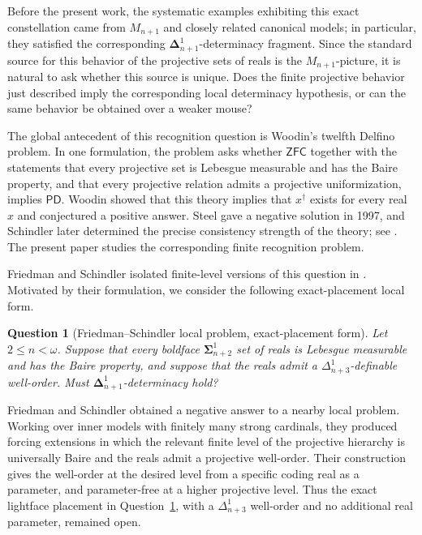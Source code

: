 \documentclass[a4paper,11pt]{article}
\newtheorem{question}{Question}
\newcommand{\PD}{\mathsf{PD}}
\begin{document}
Before the present work, the systematic examples exhibiting this exact
constellation came from \(M_{n+1}\) and closely related canonical models;
in particular, they satisfied the corresponding
\(\boldsymbol\Delta^1_{n+1}\)-determinacy fragment.  Since the standard
source for this behavior of the projective sets of reals is the
\(M_{n+1}\)-picture, it is natural to ask whether this source is unique.
Does the finite projective behavior just described imply the corresponding
local determinacy hypothesis, or can the same behavior be obtained over a
weaker mouse?



The global antecedent of this recognition question is Woodin's twelfth
Delfino problem.  In one formulation, the problem asks whether $\mathsf{ZFC}$
together with the statements that every projective set is Lebesgue measurable
and has the Baire property, and that every projective relation admits a
projective uniformization, implies $\PD$.  Woodin showed that this theory
implies that $x^\dagger$ exists for every real $x$ and conjectured a
positive answer.  Steel gave a negative solution in 1997, and Schindler
later determined the precise consistency strength of the theory; see
\cite{schindler_delfino,Schindler2002CoreModel,CaicedoLoeweDelfino2019}.
The present paper studies
the corresponding finite recognition problem.

Friedman and Schindler isolated finite-level versions of this question in
\cite{friedman2003universally}.  Motivated by their formulation, we consider
the following exact-placement local form.

\begin{question}[Friedman--Schindler local problem, exact-placement form]
\label{question:fs-local}
Let $2\leq n<\omega$.  Suppose that every boldface
$\boldsymbol\Sigma^1_{n+2}$ set of reals is Lebesgue measurable and has the
Baire property, and suppose that the reals admit a
$\Delta^1_{n+3}$-definable well-order.  Must
$\boldsymbol\Delta^1_{n+1}$-determinacy hold?
\end{question}

Friedman and Schindler obtained a negative answer to a nearby local problem.
Working over inner models with finitely many strong cardinals, they produced
forcing extensions in which the relevant finite level of the projective
hierarchy is universally Baire and the reals admit a projective well-order.
Their construction gives the well-order at the desired level from a specific
coding real as a parameter, and parameter-free at a higher projective level.
Thus the exact lightface placement in Question~\ref{question:fs-local}, with
a $\Delta^1_{n+3}$ well-order and no additional real parameter, remained
open.
\end{document}

